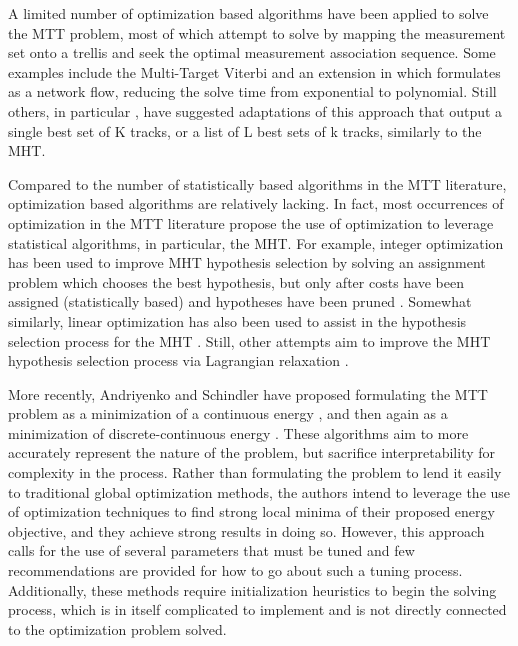 A limited number of optimization based algorithms have been applied to solve the MTT problem, most of which attempt to solve by mapping the measurement set onto a trellis and seek the optimal measurement association sequence. Some examples include the Multi-Target Viterbi \cite{Viterbi-1} and an extension in \cite{Viterbi-2} which formulates \cite{Viterbi-1} as a network flow, reducing the solve time from exponential to polynomial. Still others, in particular \cite{Viterbi-3}, have suggested adaptations of this approach that output a single best set of K tracks, or a list of L best sets of k tracks, similarly to the MHT.  

Compared to the number of statistically based algorithms in the MTT literature, optimization based algorithms are relatively lacking. In fact, most occurrences of optimization in the MTT literature propose the use of optimization to leverage statistical algorithms, in particular, the MHT. For example, integer optimization has been used to improve MHT hypothesis selection by solving an assignment problem which chooses the best hypothesis, but only after costs have been assigned (statistically based) and hypotheses have been pruned \cite{MHT-IP}. Somewhat similarly, linear optimization has also been used to assist in the hypothesis selection process for the MHT \cite{MHT-LP}. Still, other attempts aim to improve the MHT hypothesis selection process via Lagrangian relaxation \cite{Lagrangian}. 

More recently, Andriyenko and Schindler have proposed formulating the MTT problem as a minimization of a continuous energy \cite{Continuous_energy}, and then again as a minimization of discrete-continuous energy \cite{Discrete-Continuous_energy}. These algorithms aim to more accurately represent the nature of the problem, but sacrifice interpretability for complexity in the process. Rather than formulating the problem to lend it easily to traditional global optimization methods, the authors intend to leverage the use of optimization techniques to find strong local minima of their proposed energy objective, and they achieve strong results in doing so. However, this approach calls for the use of several parameters that must be tuned and few recommendations are provided for how to go about such a tuning process. Additionally, these methods require initialization heuristics to begin the solving process, which is in itself complicated to implement and is not directly connected to the optimization problem solved. 

